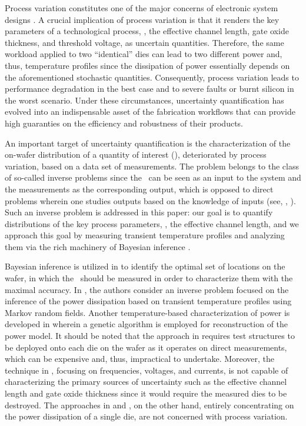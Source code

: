 Process variation constitutes one of the major concerns of electronic system designs \cite{chandrakasan2001, srivastava2010}. A crucial implication of process variation is that it renders the key parameters of a technological process, \eg, the effective channel length, gate oxide thickness, and threshold voltage, as uncertain quantities.
Therefore, the same workload applied to two ``identical'' dies can lead to two different power and, thus, temperature profiles since the dissipation of power essentially depends on the aforementioned stochastic quantities.
Consequently, process variation leads to performance degradation in the best case and to severe faults or burnt silicon in the worst scenario.
Under these circumstances, uncertainty quantification has evolved into an indispensable asset of the fabrication workflows that can provide high guaranties on the efficiency and robustness of their products.

An important target of uncertainty quantification is the characterization of the on-wafer distribution of a quantity of interest (\qoi), deteriorated by process variation, based on a data set of measurements.
The problem belongs to the class of so-called inverse problems since the \qoi\ can be seen as an input to the system and the measurements as the corresponding output, which is opposed to direct problems wherein one studies outputs based on the knowledge of inputs (see, \eg, \cite{juan2011, juan2012}).
Such an inverse problem is addressed in this paper: our goal is to quantify distributions of the key process parameters, \eg, the effective channel length, and we approach this goal by measuring transient temperature profiles and analyzing them via the rich machinery of Bayesian inference \cite{gelman2004}.

Bayesian inference is utilized in \cite{zhang2010} to identify the optimal set of locations on the wafer, in which the \qois\ should be measured in order to characterize them with the maximal accuracy.
In \cite{paek2012}, the authors consider an inverse problem focused on the inference of the power dissipation based on transient temperature profiles using Markov random fields.
Another temperature-based characterization of power is developed in \cite{mesa-martinez2007} wherein a genetic algorithm is employed for reconstruction of the power model.
It should be noted that the approach in \cite{zhang2010} requires test structures to be deployed onto each die on the wafer as it operates on direct measurements, which can be expensive and, thus, impractical to undertake. Moreover, the technique in \cite{zhang2010}, focusing on frequencies, voltages, and currents, is not capable of characterizing the primary sources of uncertainty such as the effective channel length and gate oxide thickness since it would require the measured dies to be destroyed. The approaches in \cite{paek2012} and \cite{mesa-martinez2007}, on the other hand, entirely concentrating on the power dissipation of a single die, are not concerned with process variation.

